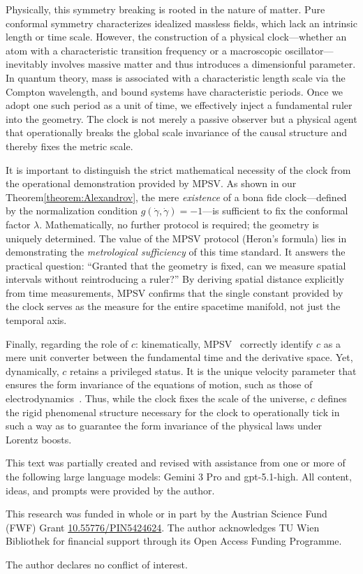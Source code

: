 \documentclass[aps,prd,twocolumn,nofootinbib,superscriptaddress]{revtex4-2}
\begin{document}
Physically, this symmetry breaking is rooted in the nature of matter. Pure conformal symmetry characterizes idealized massless fields, which lack an intrinsic length or time scale. However, the construction of a physical clock---whether an atom with a characteristic transition frequency or a macroscopic oscillator---inevitably involves massive matter and thus introduces a dimensionful parameter. In quantum theory, mass is associated with a characteristic length scale via the Compton wavelength, and bound systems have characteristic periods. Once we adopt one such period as a unit of time, we effectively inject a fundamental ruler into the geometry. The clock is not merely a passive observer but a physical agent that operationally breaks the global scale invariance of the causal structure and thereby fixes the metric scale.

It is important to distinguish the strict mathematical necessity of the clock from the operational demonstration provided by MPSV. As shown in our Theorem\ref{theorem:Alexandrov}, the mere \emph{existence} of a bona fide clock---defined by the normalization condition $g(\dot{\gamma}, \dot{\gamma})=-1$---is sufficient to fix the conformal factor $\lambda$. Mathematically, no further protocol is required; the geometry is uniquely determined. The value of the MPSV protocol (Heron's formula) lies in demonstrating the \emph{metrological sufficiency} of this time standard. It answers the practical question: ``Granted that the geometry is fixed, can we measure spatial intervals without reintroducing a ruler?'' By deriving spatial distance explicitly from time measurements, MPSV confirms that the single constant provided by the clock serves as the measure for the entire spacetime manifold, not just the temporal axis.

Finally, regarding the role of $c$: kinematically, MPSV~\cite{matsas-2024} correctly identify $c$ as a mere unit converter between the fundamental time and the derivative space. Yet, dynamically, $c$ retains a privileged status. It is the unique velocity parameter that ensures the form invariance of the equations of motion, such as those of electrodynamics~\cite{svozil-relrel,svozil-2001-convention}. Thus, while the clock fixes the scale of the universe, $c$ defines the rigid phenomenal structure necessary for the clock to operationally tick in such a way as to guarantee the form invariance of the physical laws under Lorentz boosts.


\begin{acknowledgments}
This text was partially created and revised with assistance from one or more of the following large language models:  Gemini 3 Pro
and gpt-5.1-high. All content, ideas, and prompts were provided by the author.

This research was funded in whole or in part by the Austrian Science Fund (FWF) Grant \href{https://doi.org/10.55776/PIN5424624}{10.55776/PIN5424624}.
The author acknowledges TU Wien Bibliothek for financial support through its Open Access Funding Programme.

The author declares no conflict of interest.
\end{acknowledgments}


\end{document}
